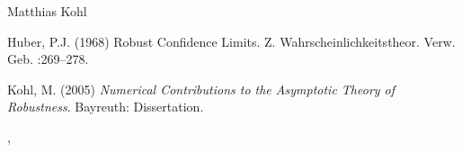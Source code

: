 \begin{Author}\relax
Matthias Kohl 
\end{Author}
\begin{References}\relax
Huber, P.J. (1968) Robust Confidence Limits. Z. Wahrscheinlichkeitstheor.
Verw. Geb. :269--278.

Kohl, M. (2005) \emph{Numerical Contributions to the Asymptotic Theory of Robustness}. 
Bayreuth: Dissertation.
\end{References}
\begin{SeeAlso}\relax
{}, 
\end{SeeAlso}

